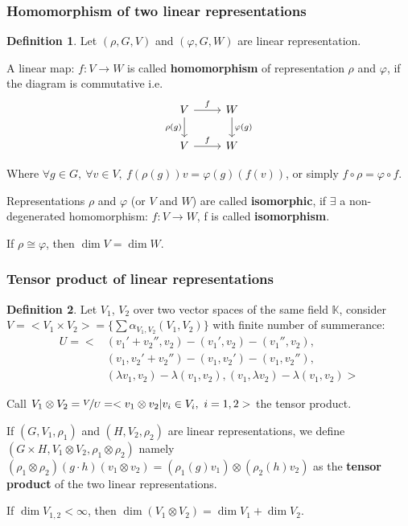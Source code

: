 \documentclass[12pt, a4paper]{article}
\theoremstyle{definition}
\newtheorem{definition}{Definition}[section]
\begin{document}
\subsubsection{Homomorphism of two linear representations}
\begin{definition}
    Let $(\rho,G,V) $ and $(\varphi,G,W) $ are linear representation.
    \par
    A linear map: $f:V\rightarrow W $ is called \textbf{homomorphism} of representation $\rho$
    and $\varphi$, if the diagram is commutative i.e.
    \[
        \begin{tikzcd}
            V \arrow{r}{f} \arrow[swap]{d}{\rho(g)} & W \arrow{d}{\varphi(g)} \\
            V \arrow{r}{f}& W
        \end{tikzcd}
    \]
    \par
    Where $\forall g \in G,\ \forall v \in V,\ f(\rho(g))v = \varphi(g)(f(v)) $, or simply $ 
    f \circ \rho = \varphi \circ f $.
    \par
    Representations $\rho$ and $\varphi$ (or $V$ and $W$) are called \textbf{isomorphic}, if 
    $\exists$ a non-degenerated homomorphism: $f : V \rightarrow W $, f is called \textbf{
    isomorphism}.
    \par
    If $\rho \cong \varphi $, then $\dim V = \dim W$.
\end{definition}
\subsubsection{Tensor product of linear representations}
\begin{definition}
    Let $V_1$, $V_2$ over two vector spaces of the same field $\mathbb{K}$, consider $V= <V_1
    \times V_2> = \{\sum\alpha_{V_1, V_2}(V_1, V_2) \}$ with finite number of summerance:
    \begin{equation}
        \begin{aligned}
        U = <{} &(v_1'+ v_2'',v_2)-(v_1',v_2)-(v_1'',v_2), \\
                &(v_1, v_2' + v_2'')-(v_1,v_2')-(v_1,v_2''), \\
                &(\lambda v_1, v_2) -\lambda(v_1,v_2), (v_1,\lambda v_2)-\lambda(v_1, v_2)>
        \end{aligned}
    \end{equation}
    \par
    Call $V_1 \otimes V_2 = \nicefrac{V}{U} = <v_1 \otimes v_2 |v_i \in V_i,\ i=1,2> $ the 
    tensor product.
    \par
    If $(G, V_1, \rho_1) $ and $(H, V_2, \rho_2) $ are linear representations, we define $(G 
    \times H, V_1\otimes V_2, \rho_1\otimes \rho_2) $ namely $(\rho_1\otimes \rho_2)(g \cdot
    h)(v_1\otimes v_2)= (\rho_1(g)v_1)\otimes (\rho_2(h)v_2) $ as the \textbf{tensor product}
    of the two linear representations.
    \par
    If $\dim V_{1,2} < \infty$, then $\dim (V_1\otimes V_2) = \dim V_1 + \dim V_2$.
\end{definition}
\newpage
\end{document}
